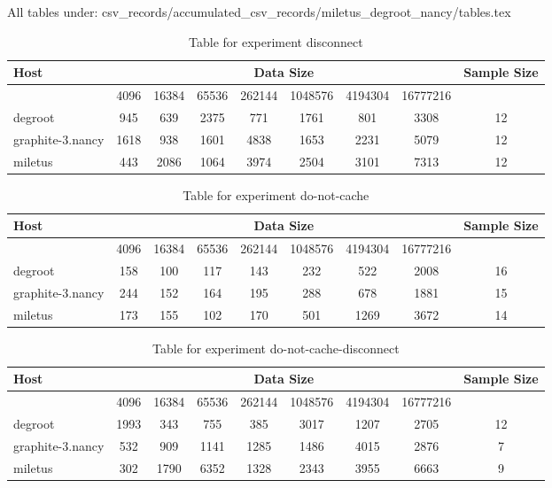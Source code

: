 All tables under: csv_records/accumulated_csv_records/miletus_degroot_nancy/tables.tex
\begin{table}
\caption{Table for experiment disconnect}
\begin{tabular}{@{}lcccccccc@{}}
\toprule
Host    & \multicolumn{7}{c}{Data Size}          & Sample Size \\ \midrule
& 4096  & 16384  & 65536  & 262144  & 1048576  & 4194304  & 16777216              \\ \midrule
degroot  & 945  & 639  & 2375  & 771  & 1761  & 801  & 3308  & 12 \\
graphite-3.nancy  & 1618  & 938  & 1601  & 4838  & 1653  & 2231  & 5079  & 12 \\
miletus  & 443  & 2086  & 1064  & 3974  & 2504  & 3101  & 7313  & 12 \\
\bottomrule
\end{tabular}
\end{table}

\begin{table}
\caption{Table for experiment do-not-cache}
\begin{tabular}{@{}lcccccccc@{}}
\toprule
Host    & \multicolumn{7}{c}{Data Size}          & Sample Size \\ \midrule
& 4096  & 16384  & 65536  & 262144  & 1048576  & 4194304  & 16777216              \\ \midrule
degroot  & 158  & 100  & 117  & 143  & 232  & 522  & 2008  & 16 \\
graphite-3.nancy  & 244  & 152  & 164  & 195  & 288  & 678  & 1881  & 15 \\
miletus  & 173  & 155  & 102  & 170  & 501  & 1269  & 3672  & 14 \\
\bottomrule
\end{tabular}
\end{table}

\begin{table}
\caption{Table for experiment do-not-cache-disconnect}
\begin{tabular}{@{}lcccccccc@{}}
\toprule
Host    & \multicolumn{7}{c}{Data Size}          & Sample Size \\ \midrule
& 4096  & 16384  & 65536  & 262144  & 1048576  & 4194304  & 16777216              \\ \midrule
degroot  & 1993  & 343  & 755  & 385  & 3017  & 1207  & 2705  & 12 \\
graphite-3.nancy  & 532  & 909  & 1141  & 1285  & 1486  & 4015  & 2876  & 7 \\
miletus  & 302  & 1790  & 6352  & 1328  & 2343  & 3955  & 6663  & 9 \\
\bottomrule
\end{tabular}
\end{table}

